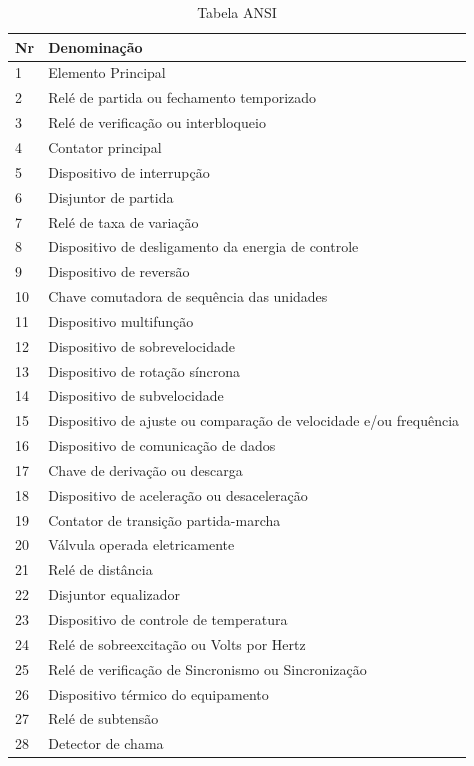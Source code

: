 \documentclass[a5paper]{ufsc-thesis}
\begin{document}
\begin{longtable}{|l|l|}
\caption{Tabela ANSI}
\hline
  Nr & Denominação \\ \hline
  1 & Elemento Principal \\ \hline
  2 & Relé de partida ou fechamento temporizado \\ \hline
  3 & Relé de verificação ou interbloqueio \\ \hline
  4 & Contator principal \\ \hline
  5 & Dispositivo de interrupção \\ \hline
  6 & Disjuntor de partida \\ \hline
  7 & Relé de taxa de variação \\ \hline
  8 & Dispositivo de desligamento da energia de controle \\ \hline
  9 & Dispositivo de reversão \\ \hline
  10 & Chave comutadora de sequência das unidades \\ \hline
  11 & Dispositivo multifunção \\ \hline
  12 & Dispositivo de sobrevelocidade \\ \hline
  13 & Dispositivo de rotação síncrona \\ \hline
  14 & Dispositivo de subvelocidade \\ \hline
  15 & Dispositivo de ajuste ou comparação de velocidade e/ou frequência \\ \hline
  16 & Dispositivo de comunicação de dados \\ \hline
  17 & Chave de derivação ou descarga \\ \hline
  18 & Dispositivo de aceleração ou desaceleração \\ \hline
  19 & Contator de transição partida-marcha \\ \hline
  20 & Válvula operada eletricamente \\ \hline
  21 & Relé de distância \\ \hline
  22 & Disjuntor equalizador \\ \hline
  23 & Dispositivo de controle de temperatura \\ \hline
  24 & Relé de sobreexcitação ou Volts por Hertz \\ \hline
  25 & Relé de verificação de Sincronismo ou Sincronização \\ \hline
  26 & Dispositivo térmico do equipamento \\ \hline
  27 & Relé de subtensão \\ \hline
  28 & Detector de chama \\ \hline

\end{longtable}
\end{document}
